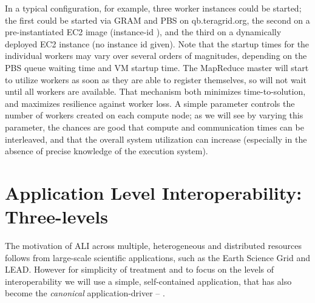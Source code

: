 \documentclass[3p,twocolumn]{elsarticle}
\begin{document}
In a typical configuration, for example, three worker instances could
be started; the first could be started via GRAM and PBS on
qb.teragrid.org, the second on a pre-instantiated EC2 image
(instance-id ), and the third on a dynamically deployed
EC2 instance (no instance id given).  Note that the startup times for
the individual workers may vary over several orders of magnitudes,
depending on the PBS queue waiting time and VM startup time.  The
MapReduce master will start to utilize workers as soon as they are
able to register themselves, so will not wait until all workers are
available.  That mechanism both minimizes time-to-solution, and
maximizes resilience against worker loss.
%
%
A simple parameter controls the number of workers created on each
compute node; as we will see by varying this parameter, the chances
are good that compute and communication times can be interleaved, and
that the overall system utilization can increase (especially in the
absence of precise knowledge of the execution system).
 

\section{Application Level Interoperability: Three-levels}
\label{sec:interop}

The motivation of ALI across multiple, heterogeneous and distributed
resources follows from large-scale scientific applications, such as
the Earth Science Grid and LEAD. However for simplicity of treatment
and to focus on the levels of interoperability we will use a simple,
self-contained application, that has also become the {\it canonical}
\mr application-driver -- \wc.
\end{document}
